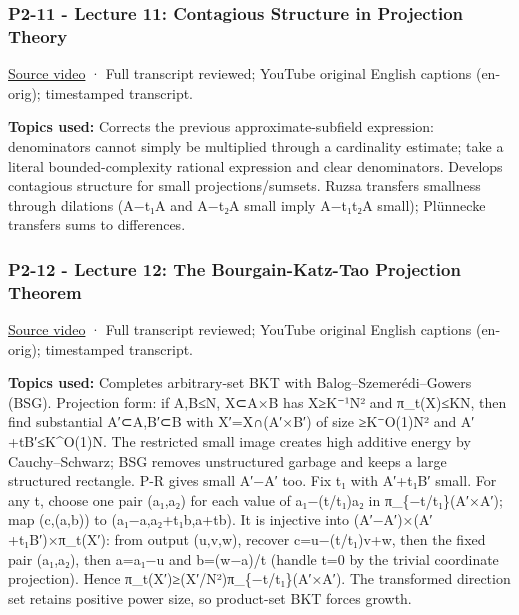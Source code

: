 \subsubsection{P2-11 - Lecture 11: Contagious Structure in Projection Theory}\label{04-visual-computing-ii-ch036-p2-11---lecture-11-contagious-structure-in-projection-theory}

\href{https://www.youtube.com/watch?v=Uz7aJtbfqkU}{Source video} · Full transcript reviewed; YouTube original English captions (en-orig); timestamped transcript.

\textbf{Topics used:} Corrects the previous approximate-subfield expression: denominators cannot simply be multiplied through a cardinality estimate; take a literal bounded-complexity rational expression and clear denominators. Develops contagious structure for small projections/sumsets. Ruzsa transfers smallness through dilations (A−t₁A and A−t₂A small imply A−t₁t₂A small); Plünnecke transfers sums to differences.

\subsubsection{P2-12 - Lecture 12: The Bourgain-Katz-Tao Projection Theorem}\label{04-visual-computing-ii-ch036-p2-12---lecture-12-the-bourgain-katz-tao-projection-theorem}

\href{https://www.youtube.com/watch?v=aHQxdnufLbg}{Source video} · Full transcript reviewed; YouTube original English captions (en-orig); timestamped transcript.

\textbf{Topics used:} Completes arbitrary-set BKT with Balog--Szemerédi--Gowers (BSG). Projection form: if \textbar A\textbar,\textbar B\textbar≤N, X⊂A×B has \textbar X\textbar≥K⁻¹N² and \textbar π\_t(X)\textbar≤KN, then find substantial A′⊂A,B′⊂B with X′=X∩(A′×B′) of size ≥K⁻O(1)N² and \textbar A′+tB′\textbar≤K\^{}O(1)N. The restricted small image creates high additive energy by Cauchy--Schwarz; BSG removes unstructured garbage and keeps a large structured rectangle. P-R gives small A′−A′ too. Fix t₁ with A′+t₁B′ small. For any t, choose one pair (a₁,a₂) for each value of a₁−(t/t₁)a₂ in π\_\{−t/t₁\}(A′×A′); map (c,(a,b)) to (a₁−a,a₂+t₁b,a+tb). It is injective into (A′−A′)×(A′+t₁B′)×π\_t(X′): from output (u,v,w), recover c=u−(t/t₁)v+w, then the fixed pair (a₁,a₂), then a=a₁−u and b=(w−a)/t (handle t=0 by the trivial coordinate projection). Hence \textbar π\_t(X′)\textbar≥(\textbar X′\textbar/N²)\textbar π\_\{−t/t₁\}(A′×A′)\textbar. The transformed direction set retains positive power size, so product-set BKT forces growth.

